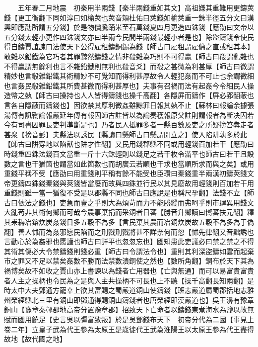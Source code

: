 　　五年春二月地震　初秦用半兩錢【秦半兩錢重如其文】高祖嫌其重難用更鑄莢錢【更工衡翻下同如淳曰如榆莢也莢音頬杜佑曰莢錢如榆莢重一銖半徑五分文曰漢興即應劭所謂五分錢】於是物價騰踊米至石萬錢夏四月更造四銖錢【應劭曰文帝以五分錢太輕小更作四銖錢文亦曰半兩今民間半兩錢最輕小者是也】除盜鑄錢令使民得自鑄賈誼諫曰法使天下公得雇租鑄銅錫為錢【師古曰雇租謂雇傭之直或租其本】敢雜以鉛鐵為它巧者其罪黥然鑄錢之情非殽雜為巧則不可得贏【師古曰殽謂亂雜也不得贏謂無餘利也言不雜鉛鐵則無利也殽音爻】而殽之甚微為利甚厚【師古曰微謂精妙也言殽雜鉛鐵其術精妙不可覺知而得利甚厚故令人輕犯姦而不可止也余謂微細也言姦民殽雜鉛鐵其所費甚微而得利甚厚也】夫事有召禍而法有起姦今令細民人操造幣之埶【師古曰操持也人人皆得鑄錢也操千高翻】各隱屛而鑄作【屛必郢翻蔽也言各自隱蔽而鑄錢也】因欲禁其厚利微姦雖黥罪日報其埶不止【蘇林曰報論余據張湯傳有訊鞫論報嚴延年傳有報囚師古註皆以為論奏穫報原父註則謂報者為斷决囚若今有司書囚罪長吏判凖斷是也】乃者民人抵罪多者一縣百數及吏之所疑搒笞犇走者甚衆【搒音彭】夫縣法以誘民【縣讀曰懸師古曰懸謂開立之】使入陷阱孰多於此【師古曰阱穿地以陷獸也阱才性翻】又民用錢郡縣不同或用輕錢百加若干【應劭曰時錢重四銖法錢百文當重一斤十六銖輕則以錢足之若干枚令滿平也師古曰若干且設數之言也干猶箇也謂當如此箇數也而胡廣云若順也干求也當順所求而與之矣】或用重錢平稱不受【應劭曰用重錢則平稱有餘不能受也臣瓚曰秦錢重半兩漢初鑄莢錢文帝更鑄四銖錢秦錢與莢錢皆當廢而故與四銖並行民以其見廢故用輕錢則百加若干用重錢則雖一當一猶復不受是以郡縣不同也師古曰應說是也稱尺孕翻】法錢不立【師古曰依法之錢也】吏急而壹之乎則大為煩苛而力不能勝縱而弗呵乎則市肆異用錢文大亂苟非其術何鄉而可哉今農事棄捐而采銅者日蕃【勝音升鄉讀曰嚮蕃扶元翻】釋其耒耨冶鎔炊炭姦錢日多五穀不為多【言民棄其農而冶銅炊炭故五穀不為多為于偽翻】善人怵而為姦邪愿民陷而之刑戮刑戮將甚不詳奈何而忽【怵先律翻又音黜誘也言動心於為姦邪也愿謹也師古曰詳平也忽忽忘也】國知患此吏議必曰禁之禁之不得其術其傷必大令禁鑄錢則錢必重【師古曰令謂法令也】重則其利深盜鑄如雲而起棄市之罪又不足以禁矣姦數不勝而法禁數潰銅使之然也【數所角翻】銅布於天下其為禍博矣故不如收之賈山亦上書諫以為錢者亡用器也【亡與無通】而可以易富貴富貴者人主之操柄也令民為之是與人主共操柄不可長也上不聽【操千高翻長知兩翻】是時太中大夫鄧通方寵幸上欲其富賜之蜀嚴道銅山使鑄錢【班志嚴道屬蜀郡括地志雅州榮經縣北三里有銅山即鄧通得賜銅山鑄錢者也唐榮經即漢嚴道也】吳王濞有豫章銅山【豫章秦鄣郡地高帝分置豫章郡】招致天下亡命者以鑄錢東煮海水為鹽以故無賦而國用饒足【史言吳以彊富致叛】於是吳鄧錢布天下　初帝分代為二國【事見上卷二年】立皇子武為代王參為太原王是歲徙代王武為淮陽王以太原王參為代王盡得故地【故代國之地】

